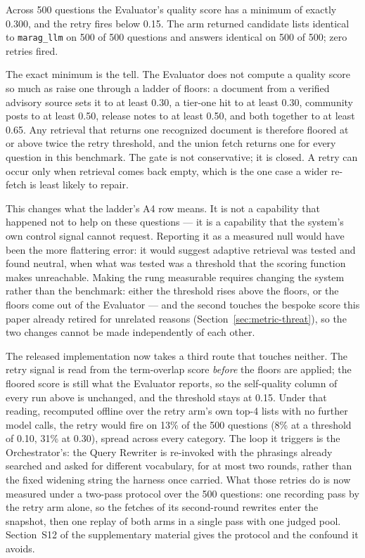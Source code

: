 \documentclass[acmsmall,review,anonymous,screen]{acmart}
\begin{document}
Across 500 questions the Evaluator's quality score has a minimum of exactly
0.300, and the retry fires below 0.15. The arm returned candidate lists
identical to \texttt{marag\_llm} on 500 of 500 questions and answers identical
on 500 of 500; zero retries fired.

The exact minimum is the tell. The Evaluator does not compute a quality score
so much as raise one through a ladder of floors: a document from a verified
advisory source sets it to at least 0.30, a tier-one hit to at least 0.30,
community posts to at least 0.50, release notes to at least 0.50, and both
together to at least 0.65. Any retrieval that returns one recognized document
is therefore floored at or above twice the retry threshold, and the union fetch
returns one for every question in this benchmark. The gate is not conservative;
it is closed. A retry can occur only when retrieval comes back empty, which is
the one case a wider re-fetch is least likely to repair.

This changes what the ladder's A4 row means. It is not a capability that
happened not to help on these questions --- it is a capability that the
system's own control signal cannot request. Reporting it as a measured null
would have been the more flattering error: it would suggest adaptive retrieval
was tested and found neutral, when what was tested was a threshold that the
scoring function makes unreachable. Making the rung measurable requires
changing the system rather than the benchmark: either the threshold rises above
the floors, or the floors come out of the Evaluator --- and the second touches
the bespoke score this paper already retired for unrelated reasons
(Section~\ref{sec:metric-threat}), so the two changes cannot be made
independently of each other.

The released implementation now takes a third route that touches neither. The
retry signal is read from the term-overlap score \emph{before} the floors are
applied; the floored score is still what the Evaluator reports, so the
self-quality column of every run above is unchanged, and the threshold stays at
0.15. Under that reading, recomputed offline over the retry arm's own top-4
lists with no further model calls, the retry would fire on 13\% of the 500
questions (8\% at a threshold of 0.10, 31\% at 0.30), spread across every
category. The loop it triggers is the Orchestrator's: the Query Rewriter is
re-invoked with the phrasings already searched and asked for different
vocabulary, for at most two rounds, rather than the fixed widening string the
harness once carried. What those retries do is now measured under a two-pass protocol over the 500
questions: one recording pass by the retry arm alone, so the fetches of its
second-round rewrites enter the snapshot, then one replay of both arms in a
single pass with one judged pool. Section~S12 of the supplementary material
gives the protocol and the confound it avoids.
\end{document}

